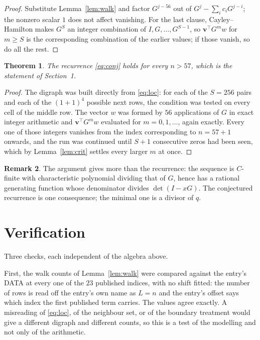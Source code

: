 \documentclass[11pt,a4paper]{article}
\theoremstyle{plain}
\newtheorem{theorem}{Theorem}
\theoremstyle{definition}
\newtheorem{remark}[theorem]{Remark}
\begin{document}
\begin{proof}
Substitute Lemma~\ref{lem:walk} and factor $G^{j-56}$ out of
$G^{j}-\sum_ic_iG^{j-i}$; the nonzero scalar $1$ does not affect
vanishing. For the last clause, Cayley--Hamilton makes $G^{S}$ an integer combination of
$I,G,\dots,G^{S-1}$, so $\mathbf{v}^{\!\top}G^{m}w$ for $m\ge S$ is the corresponding
combination of the earlier values; if those vanish, so do all the rest.
\end{proof}

\begin{theorem}
The recurrence \eqref{eq:conj} holds for every $n>57$, which is the statement of
Section~1.
\end{theorem}

\begin{proof}
The digraph was built directly from \eqref{eq:loc}: for each of the $S=256$ pairs and each
of the $(1+1)^{4}$ possible next rows, the condition was tested on every cell of
the middle row. The vector $w$ was formed by $56$ applications of $G$ in exact integer
arithmetic and $\mathbf{v}^{\!\top}G^{m}w$ evaluated for $m=0,1,\dots$, again exactly.
Every one of those integers vanishes from the index corresponding to $n=57+1$ onwards,
and the run was continued until $S+1$ consecutive zeros had been seen, which by
Lemma~\ref{lem:crit} settles every larger $m$ at once.
\end{proof}

\begin{remark}
The argument gives more than the recurrence: the sequence is $C$-finite with characteristic
polynomial dividing that of $G$, hence has a rational generating function whose denominator
divides $\det(I-xG)$. The conjectured recurrence is one consequence; the minimal one is a
divisor of $q$.
\end{remark}

\section{Verification}

Three checks, each independent of the algebra above.

First, the walk counts of Lemma~\ref{lem:walk} were compared against the entry's DATA at
every one of the $23$ published indices, with no shift fitted: the number of rows is
read off the entry's own name as $L=n$ and the entry's offset says which index the first
published term carries. The values agree exactly. A misreading of \eqref{eq:loc}, of the
neighbour set, or of the boundary treatment would give a different digraph and different
counts, so this is a test of the modelling and not only of the arithmetic.
\end{document}
